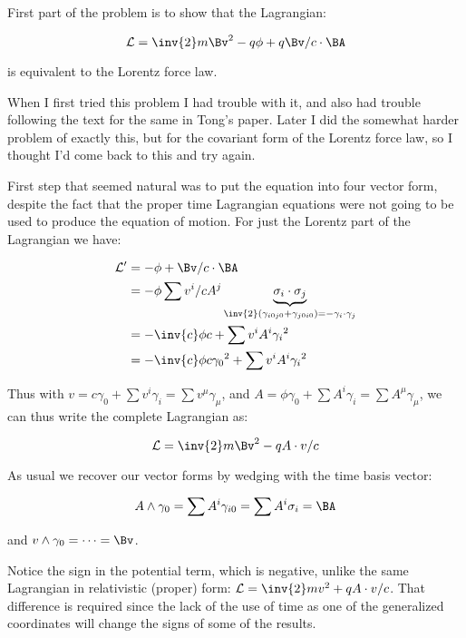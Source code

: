 \documentclass{article}
\newcommand{\LL}[0]{\mathcal{L}}
\begin{document}
First part of the problem is to show that the Lagrangian:

\begin{equation*}
\LL = \inv{2} m \Bv^2 -q \phi + q \Bv/c \cdot \BA
\end{equation*}

is equivalent to the Lorentz force law.

When I first tried this problem I had trouble with it, and also had trouble following the text for the same in Tong's paper.  Later I did the somewhat harder problem of exactly
this, but for the covariant form of the Lorentz force law, so I thought I'd come back to this and try again.

First step that seemed natural was to put the equation into four vector form, despite the fact that the proper time Lagrangian equations were not going to be used to
produce the equation of motion.  For just the Lorentz part of the Lagrangian we have:


\begin{align*}
\LL' 
&= -\phi + \Bv/c \cdot \BA \\
&= -\phi \sum v^i/c A^j \underbrace{\sigma_i \cdot \sigma_j}_{\inv{2}(\gamma_{i0j0} + \gamma_{j0i0}) = - \gamma_i \cdot \gamma_j} \\
&= -\inv{c} \phi c + \sum v^i A^i {\gamma_i}^2 \\
&= -\inv{c} \phi c {\gamma_0}^2 + \sum v^i A^i {\gamma_i}^2 \\
\end{align*}

Thus with $v = c \gamma_0 + \sum v^i \gamma_i = \sum v^{\mu} \gamma_{\mu}$, and $A = \phi \gamma_0 + \sum A^{i} \gamma_i = \sum A^{\mu} \gamma_{\mu}$, we can thus write the complete
Lagrangian as:

\begin{equation*}
\LL = \inv{2} m \Bv^2 - q A \cdot v/c
\end{equation*}

As usual we recover our vector forms by wedging with the time basis vector:

\begin{equation*}
A \wedge \gamma_0 = \sum A^i \gamma_{i0} = \sum A^i \sigma_i = \BA
\end{equation*}

and $v \wedge \gamma_0 = \cdots = \Bv$.

Notice the sign in the potential term, which is negative, unlike the same Lagrangian in relativistic (proper) form: $\LL = \inv{2}m v^2 + q A \cdot v/c$.  That difference is required
since the lack of the use of time as one of the generalized coordinates will change the signs of some of the results.
\end{document}
